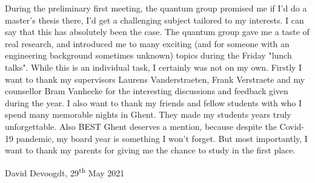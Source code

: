 During the preliminary first meeting, the quantum group promised me if I'd do a master's thesis there, I'd get a challenging subject tailored to my interests. I can say that this has absolutely been the case. The quantum group gave me a taste of real research, and introduced me to many exciting (and for someone with an engineering background sometimes unknown) topics during the Friday "lunch talks".
While this is an individual task, I certainly was not on my own. Firstly I want to thank my supervisors Laurens Vanderstraeten, Frank Verstraete and my counsellor Bram Vanhecke for the interesting discussions and feedback given during the year.
I also want to thank my friends and fellow students with who I spend many memorable nights in Ghent. They made my students years truly unforgettable. Also BEST Ghent deserves a mention, because despite the Covid-19 pandemic, my board year is something I won't forget. But most importantly, I want to thank my parents for giving me the chance to study in the first place.

\noindent

David Devoogdt, 29\textsuperscript{th} May 2021
